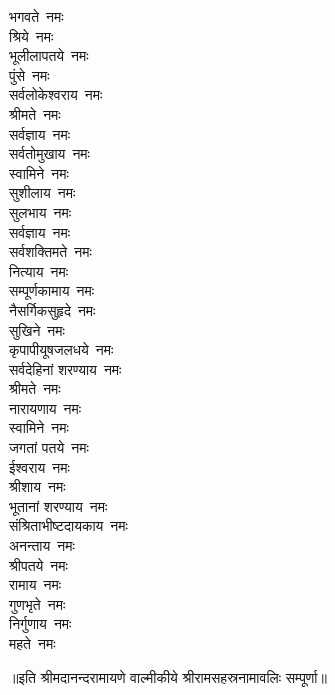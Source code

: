 \begin{multicols}{2}
\begin{flushleft}
भगवते~नमः\\
श्रिये~नमः\\
भूलीलापतये~नमः\\
पुंसे~नमः\\
सर्वलोकेश्वराय~नमः\hfill{}\\
श्रीमते~नमः\\
सर्वज्ञाय~नमः\\
सर्वतोमुखाय~नमः\\
स्वामिने~नमः\\
सुशीलाय~नमः\\
सुलभाय~नमः\\
सर्वज्ञाय~नमः\\
सर्वशक्तिमते~नमः\\
नित्याय~नमः\\
सम्पूर्णकामाय~नमः\hfill{}\\
नैसर्गिकसुहृदे~नमः\\
सुखिने~नमः\\
कृपापीयूषजलधये~नमः\\
सर्वदेहिनां शरण्याय~नमः\\
श्रीमते~नमः\\
नारायणाय~नमः\\
स्वामिने~नमः\\
जगतां पतये~नमः\\
ईश्वराय~नमः\\
श्रीशाय~नमः\hfill{}\\
भूतानां शरण्याय~नमः\\
संश्रिताभीष्टदायकाय~नमः\\
अनन्ताय~नमः\\
श्रीपतये~नमः\\
रामाय~नमः\\
गुणभृते~नमः\\
निर्गुणाय~नमः\\
महते~नमः\\
\end{flushleft}
\end{multicols}
\centerline{॥इति श्रीमदानन्दरामायणे वाल्मीकीये श्रीरामसहस्रनामावलिः सम्पूर्णा॥}
